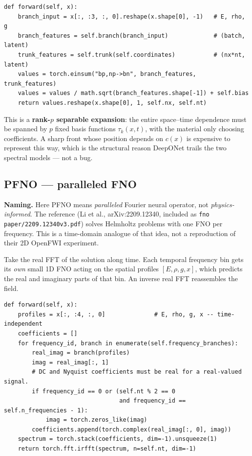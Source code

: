 \documentclass[11pt,a4paper]{article}
\begin{document}
\begin{lstlisting}
def forward(self, x):
    branch_input = x[:, :3, :, 0].reshape(x.shape[0], -1)   # E, rho, g
    branch_features = self.branch(branch_input)             # (batch, latent)
    trunk_features = self.trunk(self.coordinates)           # (nx*nt, latent)
    values = torch.einsum("bp,np->bn", branch_features, trunk_features)
    values = values / math.sqrt(branch_features.shape[-1]) + self.bias
    return values.reshape(x.shape[0], 1, self.nx, self.nt)
\end{lstlisting}

This is a \textbf{rank-$p$ separable expansion}: the entire space--time
dependence must be spanned by $p$ fixed basis functions $\tau_k(x,t)$, with the
material only choosing coefficients. A sharp front whose position depends on
$c(x)$ is expensive to represent this way, which is the structural reason
DeepONet trails the two spectral models --- not a bug.

\subsection{PFNO --- paralleled FNO}

\noindent\textbf{Naming.} Here PFNO means \emph{paralleled} Fourier neural
operator, not \emph{physics-informed}. The reference (Li et al.,
arXiv:2209.12340, included as \texttt{fno paper/2209.12340v3.pdf}) solves
Helmholtz problems with one FNO per frequency. This is a time-domain analogue of
that idea, not a reproduction of their 2D OpenFWI experiment.

Take the real FFT of the solution along time. Each temporal frequency bin gets
its \emph{own} small 1D FNO acting on the spatial profiles $[E,\rho,g,x]$, which
predicts the real and imaginary parts of that bin. An inverse real FFT
reassembles the field.

\begin{lstlisting}
def forward(self, x):
    profiles = x[:, :4, :, 0]              # E, rho, g, x -- time-independent
    coefficients = []
    for frequency_id, branch in enumerate(self.frequency_branches):
        real_imag = branch(profiles)
        imag = real_imag[:, 1]
        # DC and Nyquist coefficients must be real for a real-valued signal.
        if frequency_id == 0 or (self.nt % 2 == 0
                                 and frequency_id == self.n_frequencies - 1):
            imag = torch.zeros_like(imag)
        coefficients.append(torch.complex(real_imag[:, 0], imag))
    spectrum = torch.stack(coefficients, dim=-1).unsqueeze(1)
    return torch.fft.irfft(spectrum, n=self.nt, dim=-1)
\end{lstlisting}
\end{document}
